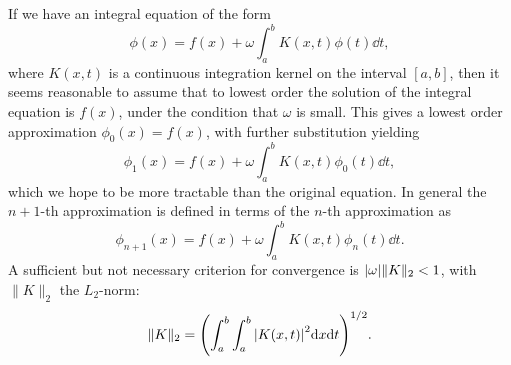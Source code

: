 \documentclass[11pt, a4paper]{report} %
\begin{document}
If we have an integral equation of the form
\begin{equation}
  \phi(x) = f(x) + \omega \int_{a}^b K(x,t)\phi(t) \dd t,
\end{equation}
where $K(x,t)$ is a continuous integration kernel on the interval $[a,b]$, then it seems reasonable to assume that to lowest order the solution of the integral equation is $f(x)$, under the condition that $\omega$ is small.
This gives a lowest order approximation $\phi_0(x) = f(x)$, with further substitution yielding 
\begin{equation}
  \phi_1(x) = f(x) + \omega \int_{a}^b K(x,t)\phi_0(t) \dd t,
\end{equation}
which we hope to be more tractable than the original equation.
In general the $n+1$-th approximation is defined in terms of the $n$-th approximation as
\begin{equation}
  \phi_{n+1}(x) = f(x) + \omega \int_{a}^b K(x,t)\phi_n(t) \dd t.
\end{equation}
A sufficient but not necessary criterion for convergence is $\abs{\omega} \lVert K \rVert_2 < 1$, with $\lVert K \rVert_2$ the $L_2$-norm:
\begin{equation}
  \lVert K \rVert_2 = {\qty( \int_{a}^b \int_a^b \abs{K(x,t)}^2 \dd x \dd t)}^{1/2}.
\end{equation}
\end{document}
